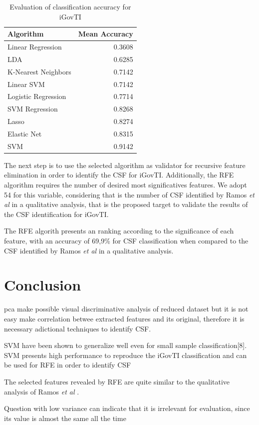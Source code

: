 \begin{table}[!t]
	\caption{Evaluation of classification accuracy for iGovTI}
  	\label{tab:ch2_tab1}
	\centering
	\begin{tabular}{|l|r|}
		\hline \rowcolor{Gray} Algorithm	& Mean Accuracy\\\hline
		Linear Regression \cite{draper2014applied}	&0.3608\\ \hline
		LDA \cite{martinez2001pca}	&0.6285\\ \hline
		K-Nearest Neighbors \cite{fukunaga1975branch}	&0.7142\\ \hline
		Linear SVM \cite{fan2008liblinear}	&0.7142\\ \hline
		Logistic Regression \cite{hosmer2013applied}	&0.7714\\ \hline
		SVM Regression \cite{smola2004tutorial}	&0.8268\\ \hline
		Lasso \cite{tibshirani1996regression}	&0.8274\\ \hline
		Elastic Net \cite{zou2005regularization}	&0.8315\\ \hline
		SVM \cite{hearst1998support}	&0.9142\\ \hline
	\end{tabular}
\end{table}

The next step is to use the selected algorithm as validator for recursive feature elimination in order to identify the CSF for iGovTI. Additionally, the RFE algorithm requires the number of desired most significatives features. We adopt 54 for this variable, considering that is the number of CSF identified by Ramos \emph{et al} \cite{ramos2016information} in a qualitative analysis, that is the proposed target to validate the results of the CSF identification for iGovTI.

The RFE algorith presents an ranking according to the significance of each feature, with an accuracy of 69,9\% for CSF classification when compared to the CSF identified by Ramos \emph{et al} \cite{ramos2016information} in a qualitative analysis.

\section{Conclusion}
\label{sec:ch2_conclusion}

pca make possible visual discriminative analysis of reduced dataset but it is not easy make correlation betwee extracted features and its original, therefore it is necessary adictional techniques to identify CSF.

SVM have been shown to generalize well even for small sample classification[8]. SVM presents high performance to reproduce the iGovTI classification and can be used for RFE in order to identify CSF

The selected features revealed by RFE are quite similar to the qualitative analysis of Ramos \emph{et al} \cite{ramos2016information}.

Question with low variance can indicate that it is irrelevant for evaluation, since its value is almost the same all the time